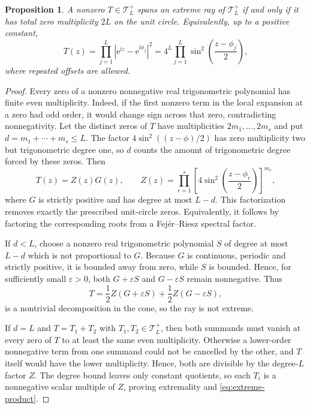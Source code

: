 \documentclass[11pt]{article}
\numberwithin{equation}{section}
\newtheorem{proposition}[theorem]{Proposition}
\theoremstyle{remark}
\newcommand{\e}{\mathrm e}
\newcommand{\ii}{\mathrm i}
\newcommand{\Tcal}{\mathcal T}
\newcommand{\abs}[1]{\left|#1\right|}
\begin{document}
\begin{proposition}\label{prop:extreme-rays}
A nonzero $T\in\Tcal_L^+$ spans an extreme ray of $\Tcal_L^+$ if and only if it has total zero multiplicity $2L$ on the unit circle. Equivalently, up to a positive constant,
\begin{equation}\label{eq:extreme-product}
  T(z)
  =\prod_{j=1}^{L}\abs{\e^{\ii z}-\e^{\ii\phi_j}}^2
  =4^L\prod_{j=1}^{L}
    \sin^2\!\left(\frac{z-\phi_j}{2}\right),
\end{equation}
where repeated offsets are allowed.
\end{proposition}

\begin{proof}
Every zero of a nonzero nonnegative real trigonometric polynomial has finite even multiplicity. Indeed, if the first nonzero term in the local expansion at a zero had odd order, it would change sign across that zero, contradicting nonnegativity. Let the distinct zeros of $T$ have multiplicities $2m_1,\ldots,2m_s$ and put $d=m_1+\cdots+m_s\leq L$. The factor $4\sin^2((z-\phi)/2)$ has zero multiplicity two but trigonometric degree one, so $d$ counts the amount of trigonometric degree forced by these zeros. Then
\[
  T(z)=Z(z)G(z),
  \qquad
  Z(z)=\prod_{r=1}^{s}
  \left[4\sin^2\!\left(\frac{z-\phi_r}{2}\right)\right]^{m_r},
\]
where $G$ is strictly positive and has degree at most $L-d$. This factorization removes exactly the prescribed unit-circle zeros. Equivalently, it follows by factoring the corresponding roots from a Fej\'er--Riesz spectral factor.

If $d<L$, choose a nonzero real trigonometric polynomial $S$ of degree at most $L-d$ which is not proportional to $G$. Because $G$ is continuous, periodic and strictly positive, it is bounded away from zero, while $S$ is bounded. Hence, for sufficiently small $\varepsilon>0$, both $G+\varepsilon S$ and $G-\varepsilon S$ remain nonnegative. Thus
\[
  T=\frac12 Z(G+\varepsilon S)+\frac12 Z(G-\varepsilon S),
\]
is a nontrivial decomposition in the cone, so the ray is not extreme.

If $d=L$ and $T=T_1+T_2$ with $T_1,T_2\in\Tcal_L^+$, then both summands must vanish at every zero of $T$ to at least the same even multiplicity. Otherwise a lower-order nonnegative term from one summand could not be cancelled by the other, and $T$ itself would have the lower multiplicity. Hence, both are divisible by the degree-$L$ factor $Z$. The degree bound leaves only constant quotients, so each $T_i$ is a nonnegative scalar multiple of $Z$, proving extremality and \eqref{eq:extreme-product}.
\end{proof}
\end{document}
